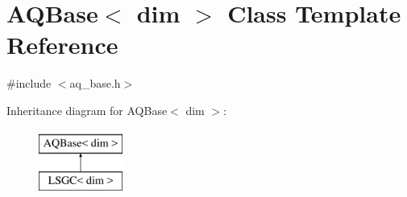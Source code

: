 \hypertarget{class_a_q_base}{}\section{A\+Q\+Base$<$ dim $>$ Class Template Reference}
\label{class_a_q_base}


{\ttfamily \#include $<$aq\+\_\+base.\+h$>$}

Inheritance diagram for A\+Q\+Base$<$ dim $>$\+:\begin{figure}[H]
\begin{center}
\leavevmode
\includegraphics[height=2.000000cm]{class_a_q_base}
\end{center}
\end{figure}
